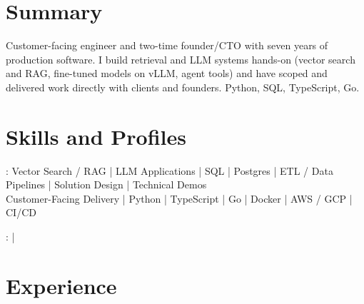 \documentclass[print]{jack-resume}
\begin{document}
\pagecolor{darkmodeBackground}


\begin{minipage}[t][1cm][t]{.03\textwidth}
    \hfill
\end{minipage}

\section{Summary}
Customer-facing engineer and two-time founder/CTO with seven years of production software. I build retrieval and LLM systems hands-on (vector search and RAG, fine-tuned models on vLLM, agent tools) and have scoped and delivered work directly with clients and founders. Python, SQL, TypeScript, Go.
\sectionsep

\section{Skills and Profiles}
:
Vector Search / RAG \hfill | \hfill
LLM Applications \hfill | \hfill
SQL \hfill | \hfill
Postgres \hfill | \hfill
ETL / Data Pipelines \hfill | \hfill
Solution Design \hfill | \hfill
Technical Demos \\
\hspace{1.0cm} Customer-Facing Delivery \hfill | \hfill
Python \hfill | \hfill
TypeScript \hfill | \hfill
Go \hfill | \hfill
Docker \hfill | \hfill
AWS / GCP \hfill | \hfill
CI/CD \\

\raggedright{
    :
      \href{https://www.linkedin.com/in/jack-sturtevant/}{ \ExternalLink} |
     \href{https://github.com/jacksturt}{ \ExternalLink}}

\section{Experience}
\end{document}
